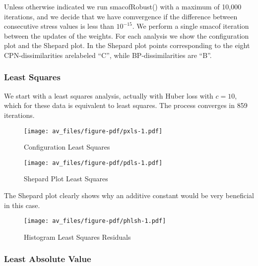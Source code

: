 \documentclass[
  12pt,
  letterpaper,
  DIV=11,
  numbers=noendperiod]{scrartcl}
\theoremstyle{plain}
\theoremstyle{remark}
\begin{document}
Unless otherwise indicated we run smacofRobust() with a maximum of
10,000 iterations, and we decide that we have comvergence if the
difference between consecutive stress values is less than
\ensuremath{10^{-15}}. We perform a single smacof iteration between the
updates of the weights. For each analysis we show the configuration plot
and the Shepard plot. In the Shepard plot points corresponding to the
eight CPN-dissimilarities arelabeled ``C'', while BP-dissimilarities are
``B''.

\subsubsection{Least Squares}\label{least-squares}

We start with a least squares analysis, actually with Huber loss with
\(c=10\), which for these data is equivalent to least squares. The
process converges in 859 iterations.

\begin{figure}[H]

{\centering \texttt{[image: av\_files/figure-pdf/pxls-1.pdf]}

}

\caption{Configuration Least Squares}

\end{figure}%

\begin{figure}[H]

{\centering \texttt{[image: av\_files/figure-pdf/pdls-1.pdf]}

}

\caption{Shepard Plot Least Squares}

\end{figure}%

The Shepard plot clearly shows why an additive constant would be very
beneficial in this case.

\begin{figure}[H]

{\centering \texttt{[image: av\_files/figure-pdf/phlsh-1.pdf]}

}

\caption{Histogram Least Squares Residuals}

\end{figure}%

\subsubsection{Least Absolute Value}\label{least-absolute-value}
\end{document}
